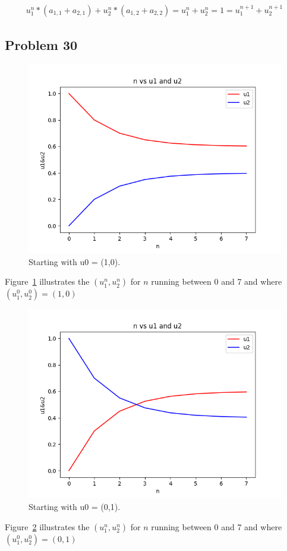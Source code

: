 \documentclass[a4paper,11pt]{article}
\begin{document}
\begin{align}
u^n_1 * (a_{1,1} + a_{2,1}) + u^n_2 * (a_{1,2} + a_{2,2})= u^n_1 + u^n_2 = 1 = u^{n+1}_1 + u^{n+1}_2 
\end{align}

\subsection*{Problem 30}



\begin{figure}[htbp]
\centerline{\includegraphics[scale=.5]{python/section_3_1_exercise_30_figure_1.png}}
\caption{Starting with u0 = (1,0).}
\label{fig:u_1_0}
\end{figure}

Figure~\ref{fig:u_1_0} illustrates the $(u^n_1, u^n_2)$ for $n$ running between 0 and 7 and where $(u^0_1, u^0_2) = (1,0)$\\

\begin{figure}[htbp]
\centerline{\includegraphics[scale=.5]{python/section_3_1_exercise_30_figure_2.png}}
\caption{Starting with u0 = (0,1).}
\label{fig:u_0_1}
\end{figure}
Figure~\ref{fig:u_0_1} illustrates the $(u^n_1, u^n_2)$ for $n$ running between 0 and 7 and where $(u^0_1, u^0_2) = (0,1)$\\
\end{document}
